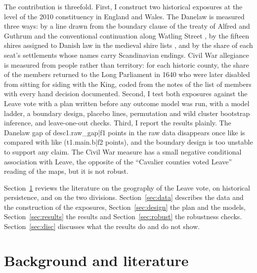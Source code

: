 \documentclass[11pt,a4paper]{article}
\begin{document}
The contribution is threefold. First, I construct two historical exposures at the level of the 2010 constituency in England and Wales. The Danelaw is measured three ways: by a line drawn from the boundary clause of the treaty of Alfred and Guthrum and the conventional continuation along Watling Street \citep{davis1982,dumville1992}, by the fifteen shires assigned to Danish law in the medieval shire lists \citep{downer1972,wikithreefold}, and by the share of each seat's settlements whose names carry Scandinavian endings. Civil War allegiance is measured from people rather than territory: for each historic county, the share of the members returned to the Long Parliament in 1640 who were later disabled from sitting for siding with the King, coded from the notes of the list of members \citep{wiki1640} with every hand decision documented. Second, I test both exposures against the Leave vote with a plan written before any outcome model was run, with a model ladder, a boundary design, placebo lines, permutation and wild cluster bootstrap inference, and leave-one-out checks. Third, I report the results plainly. The Danelaw gap of {{desc1.raw_gap|f1}} points in the raw data disappears once like is compared with like ({{t1.main.b|f2}} points), and the boundary design is too unstable to support any claim. The Civil War measure has a small negative conditional association with Leave, the opposite of the ``Cavalier counties voted Leave'' reading of the maps, but it is not robust.

Section~\ref{sec:lit} reviews the literature on the geography of the Leave vote, on historical persistence, and on the two divisions. Section~\ref{sec:data} describes the data and the construction of the exposures, Section~\ref{sec:design} the plan and the models, Section~\ref{sec:results} the results and Section~\ref{sec:robust} the robustness checks. Section~\ref{sec:disc} discusses what the results do and do not show.

\section{Background and literature}\label{sec:lit}
\end{document}
